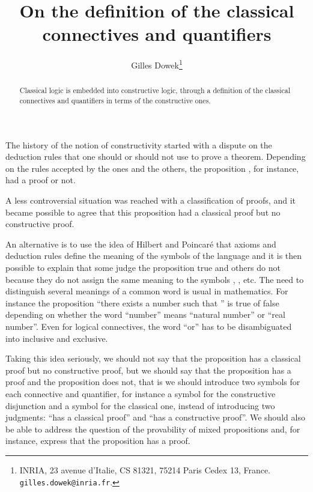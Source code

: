 \documentclass{article}
\begin{document}
\title{On the definition of the classical\\ connectives and quantifiers}
\author{Gilles Dowek\thanks{INRIA, 
23 avenue d'Italie, CS 81321, 75214 Paris Cedex 
13, France.
{\tt gilles.dowek@inria.fr}.}}
\date{}

\maketitle
\thispagestyle{empty}

\begin{abstract}
Classical logic is embedded into constructive logic, through a 
definition of the classical connectives and quantifiers in terms 
of the constructive ones.
\end{abstract}

The history of the notion of constructivity started with a dispute on
the deduction rules that one should or should not use to prove a
theorem. Depending on the rules accepted by the ones and the others,
the proposition , for instance, had a proof or not.

A less controversial situation was reached with a classification of
proofs, and it became possible to agree that this proposition had a
classical proof but no constructive proof.

An alternative is to use the idea of Hilbert and Poincar\'e that
axioms and deduction rules define the meaning of the symbols of the
language and it is then possible to explain that some judge the
proposition  true and others do not because they do not
assign the same meaning to the symbols , , etc. The need
to distinguish several meanings of a common word is usual in
mathematics. For instance the proposition ``there exists a number 
such that '' is true of false depending on whether the word
``number'' means ``natural number'' or ``real number''. Even for
logical connectives, the word ``or'' has to be disambiguated into
inclusive and exclusive.

Taking this idea seriously, we should not say that the proposition  has a classical proof but no constructive proof, but we
should say that the proposition  has a proof and 
the proposition  does not, that is we should introduce
two symbols for each connective and quantifier, for instance a symbol
 for the constructive disjunction and a symbol  for the
classical one, instead of introducing two judgments: ``has a
classical proof'' and ``has a constructive proof''.  We should also be
able to address the question of the provability of mixed propositions
and, for instance, express that the proposition  has a proof.
\end{document}
